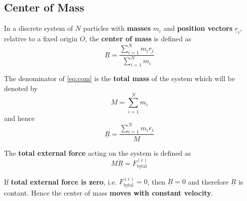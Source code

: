 \subsection{Center of Mass}
\begin{definition}
	In a discrete system of $N$ particles with {\bf masses} $m_i$ and {\bf position vectors} $\underline{r}_i$, relative to a fixed origin $O$, the {\bf center of mass} is defined as
	\begin{equation}
		\label{eq:com}
		\underline{R} = \frac{\sum\limits_{i=1}^{N}m_{i}\underline{r_{i}}}{\sum\limits_{i=1}^{N}m_{i}}
	\end{equation}
\end{definition}

\begin{note}
	The denominator of \eqref{eq:com} is the {\bf total mass} of the system which will be denoted by
	\begin{equation}
		\label{eq:total-mass}
		M = \sum\limits_{i=1}^{N}m_{i}
	\end{equation}
	and hence
	\begin{equation}
		\label{eq:com2}
		\underline{R} = \frac{\sum\limits_{i=1}^{N}m_{i}\underline{r_{i}}}{M}
	\end{equation}
\end{note}

\begin{definition}
	\label{def:total-external-force}
	The {\bf total external force} acting on the system is defined as
	\begin{equation}
		\label{eq:total-external-force-com}
		M\underline{\ddot{R}} = \underline{F^{(e)}_\text{total}}
	\end{equation}
\end{definition}

\begin{note}
	If {\bf total external force is zero}, i.e. $\underline{F^{(e)}_\text{total}} = 0$, then $\underline{\ddot{R}} = 0$ and therefore $\underline{\dot{R}}$ is contant.
	Hence the center of mass {\bf moves with constant velocity}.
\end{note}
